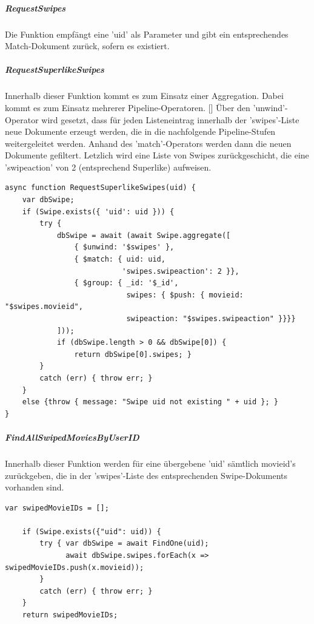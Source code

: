 \subparagraph{RequestSwipes}
Die Funktion empfängt eine 'uid' als Parameter und gibt ein entsprechendes Match-Dokument zurück, sofern es existiert.

\subparagraph{RequestSuperlikeSwipes}
Innerhalb dieser Funktion kommt es zum Einsatz einer Aggregation. 
Dabei kommt es zum Einsatz mehrerer Pipeline-Operatoren. []
Über den 'unwind'-Operator wird gesetzt, dass für jeden Listeneintrag innerhalb der 'swipes'-Liste neue Dokumente erzeugt werden, die in die nachfolgende Pipeline-Stufen weitergeleitet werden. Anhand des 'match'-Operators werden dann die neuen Dokumente gefiltert. Letzlich wird eine Liste von Swipes zurückgeschicht, die eine 'swipeaction' von 2 (entsprechend Superlike) aufweisen.

\begin{lstlisting}[caption=Swipe Service - RequestSuperlikeSwipes, label=lst:swipeserviceRequestSuperlikeSwipes]
async function RequestSuperlikeSwipes(uid) {
    var dbSwipe;
    if (Swipe.exists({ 'uid': uid })) {
        try {
            dbSwipe = await (await Swipe.aggregate([
                { $unwind: '$swipes' },
                { $match: { uid: uid,
                           'swipes.swipeaction': 2 }},
                { $group: { _id: '$_id',
                            swipes: { $push: { movieid: "$swipes.movieid",
                            swipeaction: "$swipes.swipeaction" }}}}
            ]));
            if (dbSwipe.length > 0 && dbSwipe[0]) {
                return dbSwipe[0].swipes; }
        }
        catch (err) { throw err; }
    }
    else {throw { message: "Swipe uid not existing " + uid }; }
}
\end{lstlisting}

\subparagraph{FindAllSwipedMoviesByUserID}
Innerhalb dieser Funktion werden für eine übergebene 'uid' sämtlich movieid's zurückgeben, die in der 'swipes'-Liste des entsprechenden Swipe-Dokuments vorhanden sind.

\begin{lstlisting}[caption=Swipe Service - FindAllSwipedMoviesByUserID, label=lst:swipeserviceFindAllSwipedMoviesByUserID]
    var swipedMovieIDs = [];
    
    if (Swipe.exists({"uid": uid)) {
        try { var dbSwipe = await FindOne(uid);
              await dbSwipe.swipes.forEach(x => swipedMovieIDs.push(x.movieid));
        }
        catch (err) { throw err; }
    }
    return swipedMovieIDs;
\end{lstlisting}


